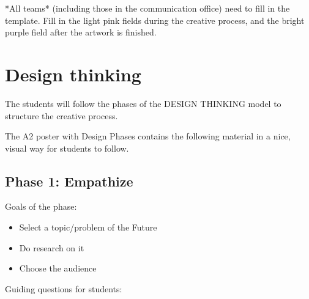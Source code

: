 \documentclass[12pt]{article}
\newcounter{question}
\begin{document}
*All teams* (including those in the communication office) need to fill in the template. Fill in the light pink fields during the creative process, and the bright purple field after the artwork is finished.

\section{Design thinking}

The students will follow the phases of the DESIGN THINKING model to structure the creative process. 

\begin{importantbox}
    The A2 poster with Design Phases contains the following material in a nice, visual way for students to follow.
\end{importantbox}


\subsection{Phase 1: Empathize}

Goals of the phase:
\begin{itemize}
\item Select a topic/problem of the Future
\item Do research on it
\item Choose the audience
\end{itemize}

Guiding questions for students:
\end{document}
